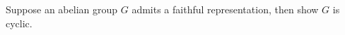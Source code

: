 \documentclass[openany]{book}
\begin{document}
\begin{prop}
    Suppose an abelian group $G$ admits a faithful representation, then show $G$ is cyclic.
\end{prop}


























\newpage
\end{document}
